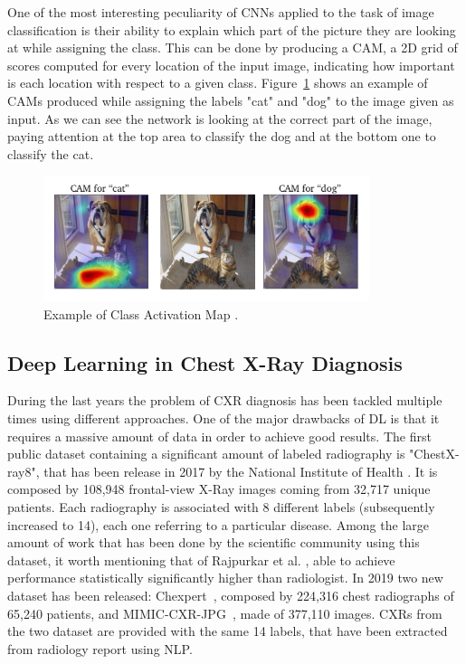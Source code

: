 \newpage

One of the most interesting peculiarity of \acp{CNN} applied to the task of image classification is their ability to explain which part of the picture they are looking at while assigning the class. This can be done by producing a \ac{CAM}, a 2D grid of scores computed for every location of the input image, indicating how important is each location with respect to a given class. Figure~\ref{fig:second_figure} shows an example of \ac{CAM}s produced while assigning the labels "cat" and "dog" to the image given as input. As we can see the network is looking at the correct part of the image, paying attention at the top area to classify the dog and at the bottom one to classify the cat. 

\begin{figure}[htbp!]
\centering
\includegraphics[width=0.85\textwidth,height=0.2\textheight]{Tesi/images/CAM}
\caption{Example of Class Activation Map \cite{cam_paper}.}
\label{fig:second_figure}
\end{figure}


\subsection{Deep Learning in Chest X-Ray Diagnosis}
\label{subsec:convolutional_neural_networks}
During the last years the problem of \ac{CXR} diagnosis has been tackled multiple times using different approaches. One of the major drawbacks of \ac{DL} is that it requires a massive amount of data in order to achieve good results. The first public dataset containing a significant amount of labeled radiography is "ChestX-ray8", that has been release in 2017 by the National Institute of Health \cite{Wang_2017}. It is composed by 108,948 frontal-view X-Ray images coming from 32,717 unique patients. Each radiography is associated with 8 different labels (subsequently increased to 14), each one referring to a particular disease. Among the large amount of work that has been done by the scientific community using this dataset, it worth mentioning that of Rajpurkar et al. \cite{rajpurkar2017chexnet}, able to achieve performance statistically significantly higher than radiologist. In 2019 two new dataset has been released: Chexpert~\cite{irvin2019chexpert}, composed by 224,316 chest radiographs of 65,240 patients, and MIMIC-CXR-JPG~\cite{johnson2019mimiccxrjpg}, made of 377,110 images. \ac{CXR}s from the two dataset are provided with the same 14 labels, that have been extracted from radiology report using \ac{NLP}. 
\newpage

